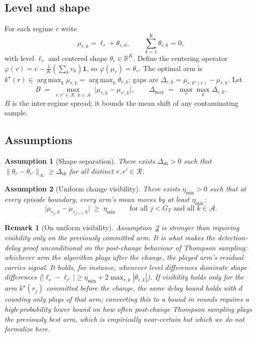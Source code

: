 \documentclass[11pt]{article}
\newtheorem{assumption}{Assumption}
\newtheorem{remark}{Remark}
\newcommand{\Acal}{\mathcal A}
\newcommand{\Rcal}{\mathcal R}
\newcommand{\one}{\mathbf 1}
\newcommand{\argmax}{\operatorname*{arg\,max}}
\newcommand{\phic}{\varphi}
\newcommand{\dsh}{\Delta_{\mathrm{sh}}}
\begin{document}
\subsection{Level and shape}

For each regime $r$ write
\begin{equation}
    \mu_{r,k}=\ell_r+\theta_{r,k},
    \qquad
    \sum_{k=1}^K \theta_{r,k}=0,
    \label{eq:level_shape_decomposition}
\end{equation}
with level $\ell_r$ and centered shape $\theta_r\in\mathbb R^K$. Define the centering operator $\phic(v)=v-\frac1K(\sum_k v_k)\one$, so $\phic(\mu_r)=\theta_r$. The optimal arm is $k^\star(r)\in\argmax_k\mu_{r,k}=\argmax_k\theta_{r,k}$; gaps are $\Delta_{r,k}=\mu_{r,k^\star(r)}-\mu_{r,k}$. Let
\begin{equation}
    B \;=\; \max_{r,r'\in\Rcal,\;k\in\Acal}\;\bigl|\mu_{r,k}-\mu_{r',k}\bigr|,
    \qquad
    \Delta_{\max} \;=\; \max_{r}\max_{k}\Delta_{r,k}.
\end{equation}
$B$ is the inter-regime spread; it bounds the mean shift of any contaminating sample.

\subsection{Assumptions}

\begin{assumption}[Shape separation]
\label{ass:shape_separation}
There exists $\dsh>0$ such that $\|\theta_r-\theta_{r'}\|_\infty\ge \dsh$ for all distinct $r,r'\in\Rcal$.
\end{assumption}

\begin{assumption}[Uniform change visibility]
\label{ass:visible_changes}
There exists $\eta_{\min}>0$ such that at every episode boundary, every arm's mean moves by at least $\eta_{\min}$:
\begin{equation}
    \bigl|\mu_{r_j,k}-\mu_{r_{j+1},k}\bigr|\;\ge\;\eta_{\min}
    \qquad\text{for all } j<G_T \text{ and all } k\in\Acal .
\end{equation}
\end{assumption}

\begin{remark}[On uniform visibility]
\label{rem:visibility}
Assumption~\ref{ass:visible_changes} is stronger than requiring visibility only on the previously committed arm. It is what makes the detection-delay proof unconditional on the post-change behaviour of Thompson sampling: whichever arm the algorithm plays after the change, the played arm's residual carries signal. It holds, for instance, whenever level differences dominate shape differences ($|\ell_r-\ell_{r'}|\ge\eta_{\min}+2\max_{r,k}|\theta_{r,k}|$). If visibility holds only for the arm $k^\star(r_j)$ committed before the change, the same delay bound holds with $d$ counting only \emph{plays of that arm}; converting this to a bound in rounds requires a high-probability lower bound on how often post-change Thompson sampling plays the previously best arm, which is empirically near-certain but which we do not formalize here.
\end{remark}
\end{document}
